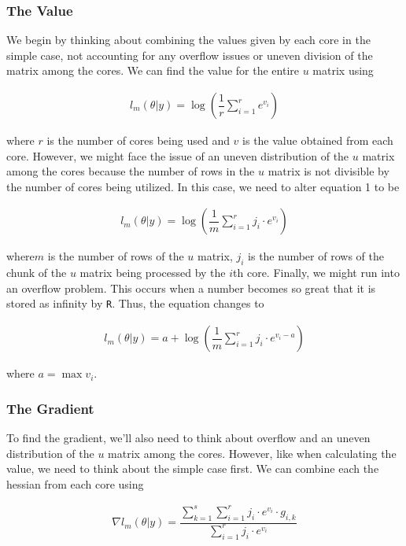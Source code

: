 \documentclass{article}
\begin{document}
\subsubsection{The Value}
We begin by thinking about combining the values given by each core in the simple case, not accounting for any overflow issues or uneven division of the matrix among the cores. We can find the value for the entire $u$ matrix using

\begin{align}
l_m(\theta|y) = \log(\dfrac{1}{r}\sum\limits_{i=1}^r e^{v_i})
\end{align}

\noindent where $r$ is the number of cores being used and $v$ is the value obtained from each core. However, we might face the issue of an uneven distribution of the $u$ matrix among the cores because the number of rows in the $u$ matrix is not divisible by the number of cores being utilized. In this case, we need to alter equation 1 to be

\begin{align}
l_m(\theta|y) = \log(\dfrac{1}{m}\sum\limits_{i=1}^r j_i \cdot e^{v_i})
\end{align}

\noindent where$m$ is the number of rows of the $u$ matrix, $j_i$ is the number of rows of the chunk of the $u$ matrix being processed by the $i$th core. Finally, we might run into an overflow problem. This occurs when a number becomes so great that it is stored as infinity by \texttt{R}. Thus, the equation changes to 

\begin{align}
l_m(\theta|y) = a + \log(\dfrac{1}{m}\sum\limits_{i=1}^r j_i \cdot e^{v_i - a})
\end{align}

\noindent where $a = \max{v_i}$.

\subsubsection{The Gradient}
To find the gradient, we'll also need to think about overflow and an uneven distribution of the $u$ matrix among the cores. However, like when calculating the value, we need to think about the simple case first. We can combine each the hessian from each core using

\begin{align}
\nabla l_m(\theta|y) =\dfrac{\sum\limits_{k=1}^s \sum\limits_{i=1}^r j_i \cdot e^{v_i} \cdot g_{i,k}}{\sum\limits_{i=1}^r j_i \cdot e^{v_i}}
\end{align}
\end{document}
